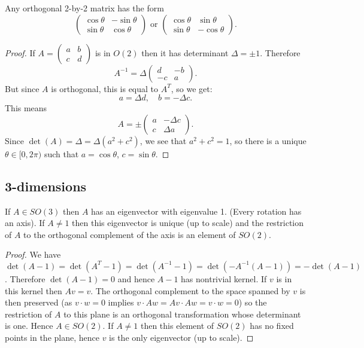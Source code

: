 \documentclass[12pt]{article}
\begin{document}
\begin{prp}
  Any orthogonal 2-by-2 matrix has the form
  \[\left(\begin{array}{cc}\cos\theta & -\sin\theta\\ \sin\theta &\cos\theta\end{array}\right)\mbox{ or }\left(\begin{array}{cc}\cos\theta & \sin\theta\\ \sin\theta &-\cos\theta\end{array}\right).\]
\end{prp}
\begin{proof}
  If $A=\left(\begin{array}{cc}a & b\\ c & d\end{array}\right)$ is in $O(2)$ then it has determinant $\Delta=\pm 1$. Therefore
  \[A^{-1}=\Delta\left(\begin{array}{cc}
    d & -b\\ -c & a
  \end{array}\right).\]
  But since $A$ is orthogonal, this is equal to $A^T$, so we get:
  \[a=\Delta d,\quad b=-\Delta c.\]
  This means
  \[A=\pm\left(\begin{array}{cc}
    a & -\Delta c\\ c & \Delta a
  \end{array}\right).\]
  Since $\det(A)=\Delta=\Delta(a^2+c^2)$, we see that $a^2+c^2=1$, so there is a unique $\theta\in[0,2\pi)$ such that $a=\cos\theta$, $c=\sin\theta$.
\end{proof}


\subsection{3-dimensions}

\begin{thm}
If $A\in SO(3)$ then $A$ has an eigenvector with eigenvalue 1. (Every rotation has an axis). If $A\neq 1$ then this eigenvector is unique (up to scale) and the restriction of $A$ to the orthogonal complement of the axis is an element of $SO(2)$.
\end{thm}
\begin{proof}
  We have $\det(A-1)=\det(A^T-1)=\det(A^{-1}-1)=\det(-A^{-1}(A-1))=-\det(A-1)$. Therefore $\det(A-1)=0$ and hence $A-1$ has nontrivial kernel. If $v$ is in this kernel then $Av=v$. The orthogonal complement to the space spanned by $v$ is then preserved (as $v\cdot w=0$ implies $v\cdot Aw=Av\cdot Aw=v\cdot w=0$) so the restriction of $A$ to this plane is an orthogonal transformation whose determinant is one. Hence $A\in SO(2)$. If $A\neq 1$ then this element of $SO(2)$ has no fixed points in the plane, hence $v$ is the only eigenvector (up to scale).
\end{proof}
\end{document}
